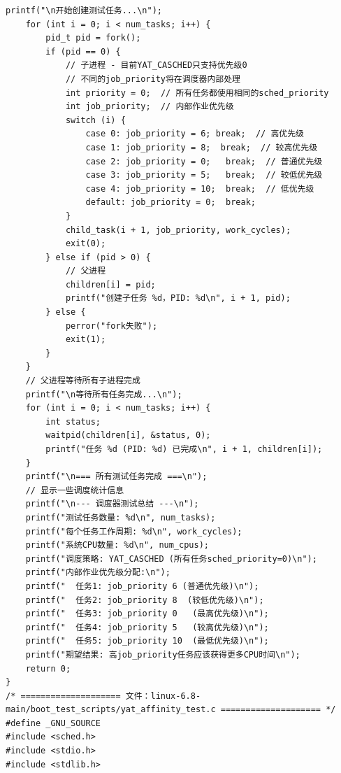 \documentclass[10pt,a4paper]{article}
\newenvironment{yatpage}{\vspace*{0pt}}{\par}
\begin{document}
\begin{yatpage}
\begin{Verbatim}[fontsize=\fontsize{8.2}{9.8}\selectfont]
    printf("\n开始创建测试任务...\n");
    for (int i = 0; i < num_tasks; i++) {
        pid_t pid = fork();
        if (pid == 0) {
            // 子进程 - 目前YAT_CASCHED只支持优先级0
            // 不同的job_priority将在调度器内部处理
            int priority = 0;  // 所有任务都使用相同的sched_priority
            int job_priority;  // 内部作业优先级
            switch (i) {
                case 0: job_priority = 6; break;  // 高优先级
                case 1: job_priority = 8;  break;  // 较高优先级
                case 2: job_priority = 0;   break;  // 普通优先级
                case 3: job_priority = 5;   break;  // 较低优先级
                case 4: job_priority = 10;  break;  // 低优先级
                default: job_priority = 0;  break;
            }
            child_task(i + 1, job_priority, work_cycles);
            exit(0);
        } else if (pid > 0) {
            // 父进程
            children[i] = pid;
            printf("创建子任务 %d，PID: %d\n", i + 1, pid);
        } else {
            perror("fork失败");
            exit(1);
        }
    }
    // 父进程等待所有子进程完成
    printf("\n等待所有任务完成...\n");
    for (int i = 0; i < num_tasks; i++) {
        int status;
        waitpid(children[i], &status, 0);
        printf("任务 %d (PID: %d) 已完成\n", i + 1, children[i]);
    }
    printf("\n=== 所有测试任务完成 ===\n");
    // 显示一些调度统计信息
    printf("\n--- 调度器测试总结 ---\n");
    printf("测试任务数量: %d\n", num_tasks);
    printf("每个任务工作周期: %d\n", work_cycles);
    printf("系统CPU数量: %d\n", num_cpus);
    printf("调度策略: YAT_CASCHED (所有任务sched_priority=0)\n");
    printf("内部作业优先级分配:\n");
    printf("  任务1: job_priority 6 (普通优先级)\n");
    printf("  任务2: job_priority 8  (较低优先级)\n");
    printf("  任务3: job_priority 0   (最高优先级)\n");
    printf("  任务4: job_priority 5   (较高优先级)\n");
    printf("  任务5: job_priority 10  (最低优先级)\n");
    printf("期望结果: 高job_priority任务应该获得更多CPU时间\n");
    return 0;
}
/* ==================== 文件：linux-6.8-main/boot_test_scripts/yat_affinity_test.c ==================== */
#define _GNU_SOURCE
#include <sched.h>
#include <stdio.h>
#include <stdlib.h>
\end{Verbatim}
\end{yatpage}
\newpage
\end{document}
